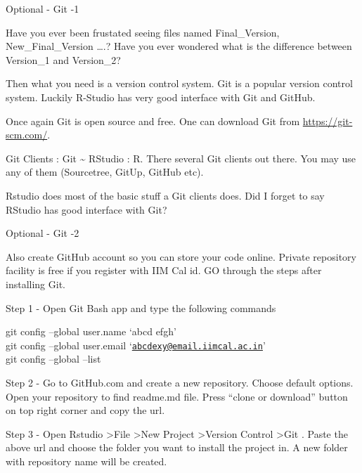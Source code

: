 \documentclass[ignorenonframetext,]{beamer}
\begin{document}
\begin{frame}{Optional - Git -1}
\protect\hypertarget{optional---git--1}{}

Have you ever been frustated seeing files named Final\_Version,
New\_Final\_Version \ldots{}.? Have you ever wondered what is the
difference between Version\_1 and Version\_2?

Then what you need is a version control system. Git is a popular version
control system. Luckily R-Studio has very good interface with Git and
GitHub.

Once again Git is open source and free. One can download Git from
\url{https://git-scm.com/}.

Git Clients : Git \textasciitilde{} RStudio : R. There several Git
clients out there. You may use any of them (Sourcetree, GitUp, GitHub
etc).

Rstudio does most of the basic stuff a Git clients does. Did I forget to
say RStudio has good interface with Git?

\end{frame}

\begin{frame}{Optional - Git -2}
\protect\hypertarget{optional---git--2}{}

Also create GitHub account so you can store your code online. Private
repository facility is free if you register with IIM Cal id. GO through
the steps after installing Git.

Step 1 - Open Git Bash app and type the following commands

git config --global user.name `abcd efgh'\\
git config --global user.email
`\href{mailto:abcdexy@email.iimcal.ac.in}{\nolinkurl{abcdexy@email.iimcal.ac.in}}'\\
git config --global --list

Step 2 - Go to GitHub.com and create a new repository. Choose default
options. Open your repository to find readme.md file. Press ``clone or
download'' button on top right corner and copy the url.

Step 3 - Open Rstudio \textgreater{}File \textgreater{}New Project
\textgreater{}Version Control \textgreater{}Git . Paste the above url
and choose the folder you want to install the project in. A new folder
with repository name will be created.

\end{frame}
\end{document}
